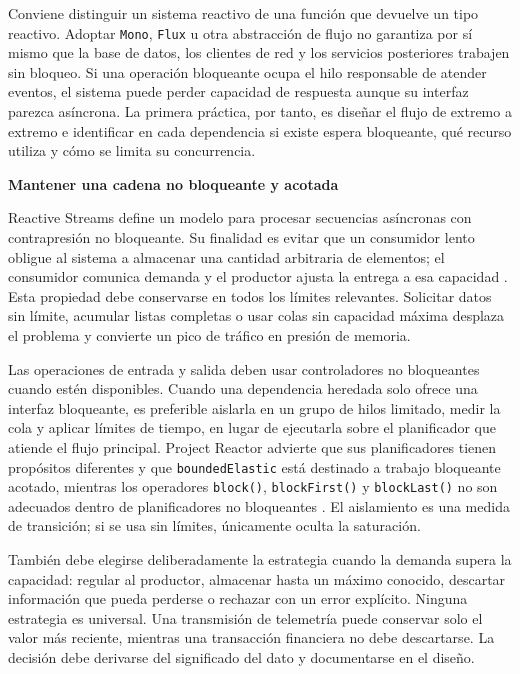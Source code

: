 \documentclass[12pt,letterpaper]{article}
\begin{document}
Conviene distinguir un sistema reactivo de una función que devuelve un tipo reactivo. Adoptar \texttt{Mono}, \texttt{Flux} u otra abstracción de flujo no garantiza por sí mismo que la base de datos, los clientes de red y los servicios posteriores trabajen sin bloqueo. Si una operación bloqueante ocupa el hilo responsable de atender eventos, el sistema puede perder capacidad de respuesta aunque su interfaz parezca asíncrona. La primera práctica, por tanto, es diseñar el flujo de extremo a extremo e identificar en cada dependencia si existe espera bloqueante, qué recurso utiliza y cómo se limita su concurrencia.

\textbf{Mantener una cadena no bloqueante y acotada}\par
Reactive Streams define un modelo para procesar secuencias asíncronas con contrapresión no bloqueante. Su finalidad es evitar que un consumidor lento obligue al sistema a almacenar una cantidad arbitraria de elementos; el consumidor comunica demanda y el productor ajusta la entrega a esa capacidad \parencite{reactivestreams}. Esta propiedad debe conservarse en todos los límites relevantes. Solicitar datos sin límite, acumular listas completas o usar colas sin capacidad máxima desplaza el problema y convierte un pico de tráfico en presión de memoria.

Las operaciones de entrada y salida deben usar controladores no bloqueantes cuando estén disponibles. Cuando una dependencia heredada solo ofrece una interfaz bloqueante, es preferible aislarla en un grupo de hilos limitado, medir la cola y aplicar límites de tiempo, en lugar de ejecutarla sobre el planificador que atiende el flujo principal. Project Reactor advierte que sus planificadores tienen propósitos diferentes y que \texttt{boundedElastic} está destinado a trabajo bloqueante acotado, mientras los operadores \texttt{block()}, \texttt{blockFirst()} y \texttt{blockLast()} no son adecuados dentro de planificadores no bloqueantes \parencite{reactorreference}. El aislamiento es una medida de transición; si se usa sin límites, únicamente oculta la saturación.

También debe elegirse deliberadamente la estrategia cuando la demanda supera la capacidad: regular al productor, almacenar hasta un máximo conocido, descartar información que pueda perderse o rechazar con un error explícito. Ninguna estrategia es universal. Una transmisión de telemetría puede conservar solo el valor más reciente, mientras una transacción financiera no debe descartarse. La decisión debe derivarse del significado del dato y documentarse en el diseño.
\end{document}
